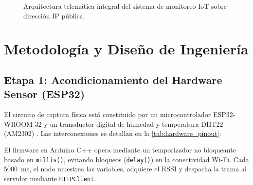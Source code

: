 \documentclass[conference]{IEEEtran}
\begin{document}
\begin{figure}[t]
\caption{Arquitectura telemática integral del sistema de monitoreo IoT sobre dirección IP pública.}
\label{fig:arquitectura_sistema}
\end{figure}

\section{Metodología y Diseño de Ingeniería}

\subsection{Etapa 1: Acondicionamiento del Hardware Sensor (ESP32)}
El circuito de captura física está constituido por un microcontrolador ESP32-WROOM-32 y un transductor digital de humedad y temperatura DHT22 (AM2302) \cite{dht22manual}. Las interconexiones se detallan en la \autoref{tab:hardware_pinout}:

\begin{table}[htbp]
\centering
\caption{Asignación de terminales físicos del hardware IoT.}
\label{tab:hardware_pinout}
\end{table}

El firmware en Arduino C++ opera mediante un temporizador no bloqueante basado en \texttt{millis()}, evitando bloqueos (\texttt{delay()}) en la conectividad Wi-Fi. Cada \SI{5000}{\milli\second}, el nodo muestrea las variables, adquiere el RSSI y despacha la trama al servidor mediante \texttt{HTTPClient}.
\end{document}

